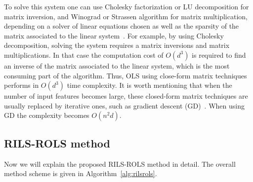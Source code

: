 \documentclass[a4paper,12pt]{elsarticle}
\begin{document}
To solve this system one can use Cholesky  factorization or LU decomposition for matrix inversion, and Winograd or Strassen algorithm for matrix multiplication, depending on a solver of linear equations chosen as well as the sparsity of the matrix associated to the linear system~\cite{krishnamoorthy2013matrix}. For example, by using Cholesky decomposition, solving the system requires a matrix inversions and matrix multiplications. In that case the computation cost of $O(d^3)$ is required to find an inverse of the matrix associated to the linear system, which is the most consuming part of the algorithm. Thus, OLS using close-form matrix techniques performs in $O(d^3)$ time complexity.  %
It is worth mentioning that when the number of input features becomes large, these closed-form matrix techniques are usually replaced by iterative ones, such as gradient descent (GD)~\cite{andrychowicz2016learning}. When using GD the complexity becomes $O(n^2d )$.

\subsection{\textsc{RILS}-\textsc{ROLS}  method}
Now we will explain the proposed \textsc{RILS}-\textsc{ROLS} method in detail. The overall method scheme is given in Algorithm~\ref{alg:rilsrols}.   
\end{document}
